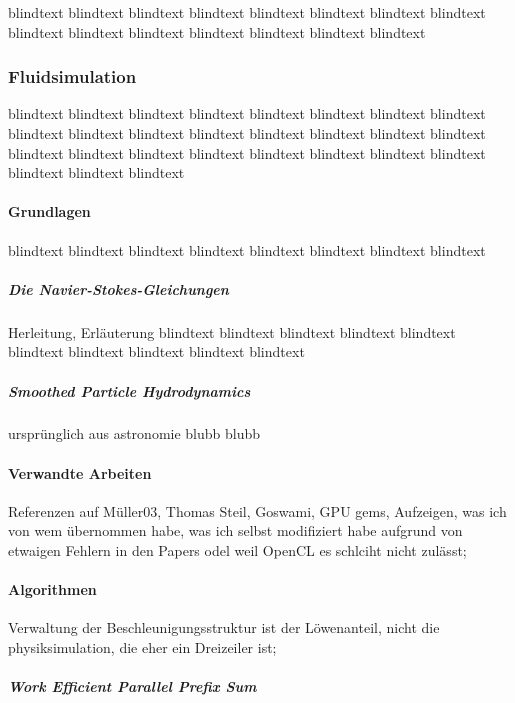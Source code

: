 

\label{sec:mechanicalDomain}
blindtext blindtext blindtext blindtext blindtext blindtext blindtext blindtext blindtext blindtext blindtext blindtext blindtext blindtext blindtext 
	
\subsubsection{Fluidsimulation}
blindtext blindtext blindtext blindtext blindtext blindtext blindtext blindtext blindtext blindtext blindtext 		
blindtext blindtext blindtext blindtext blindtext blindtext blindtext blindtext blindtext blindtext blindtext 
blindtext blindtext blindtext blindtext blindtext 
		
	\paragraph{Grundlagen}
	blindtext blindtext blindtext blindtext blindtext blindtext blindtext blindtext 
	
		\subparagraph{Die Navier-Stokes-Gleichungen}
		Herleitung, Erläuterung
		blindtext blindtext blindtext blindtext blindtext blindtext blindtext blindtext blindtext blindtext 
			
			
				
		\subparagraph{Smoothed Particle Hydrodynamics}
		ursprünglich aus astronomie blubb blubb 
		
	\paragraph{Verwandte Arbeiten}
	\label{sec:relatedWork}
	Referenzen auf Müller03, Thomas Steil, Goswami, GPU gems, Aufzeigen, was ich von wem übernommen habe, was ich selbst  
	modifiziert habe aufgrund von etwaigen Fehlern in den Papers odel weil OpenCL es schlciht nicht zulässt;
	

	\paragraph{Algorithmen}
	Verwaltung der Beschleunigungsstruktur ist der Löwenanteil, nicht die physiksimulation, die eher ein Dreizeiler 
	ist;
		\subparagraph{Work Efficient Parallel Prefix Sum}
		
